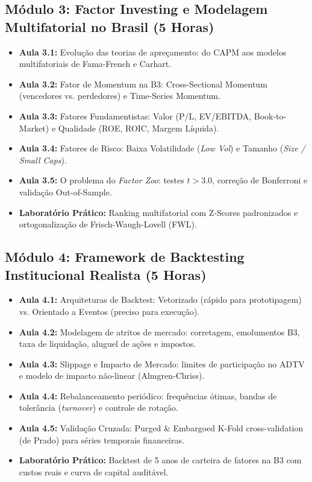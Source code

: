 \documentclass[11pt,a4paper]{article}
\begin{document}
\subsection*{Módulo 3: Factor Investing e Modelagem Multifatorial no Brasil (5 Horas)}
\begin{itemize}[leftmargin=1.5em]
    \item \textbf{Aula 3.1:} Evolução das teorias de apreçamento: do CAPM aos modelos multifatoriais de Fama-French e Carhart.
    \item \textbf{Aula 3.2:} Fator de Momentum na B3: Cross-Sectional Momentum (vencedores vs. perdedores) e Time-Series Momentum.
    \item \textbf{Aula 3.3:} Fatores Fundamentistas: Valor (P/L, EV/EBITDA, Book-to-Market) e Qualidade (ROE, ROIC, Margem Líquida).
    \item \textbf{Aula 3.4:} Fatores de Risco: Baixa Volatilidade (\textit{Low Vol}) e Tamanho (\textit{Size / Small Caps}).
    \item \textbf{Aula 3.5:} O problema do \textit{Factor Zoo}: testes $t > 3.0$, correção de Bonferroni e validação Out-of-Sample.
    \item \textbf{Laboratório Prático:} Ranking multifatorial com Z-Scores padronizados e ortogonalização de Frisch-Waugh-Lovell (FWL).
\end{itemize}

\subsection*{Módulo 4: Framework de Backtesting Institucional Realista (5 Horas)}
\begin{itemize}[leftmargin=1.5em]
    \item \textbf{Aula 4.1:} Arquiteturas de Backtest: Vetorizado (rápido para prototipagem) vs. Orientado a Eventos (preciso para execução).
    \item \textbf{Aula 4.2:} Modelagem de atritos de mercado: corretagem, emolumentos B3, taxa de liquidação, aluguel de ações e impostos.
    \item \textbf{Aula 4.3:} Slippage e Impacto de Mercado: limites de participação no ADTV e modelo de impacto não-linear (Almgren-Chriss).
    \item \textbf{Aula 4.4:} Rebalanceamento periódico: frequências ótimas, bandas de tolerância (\textit{turnover}) e controle de rotação.
    \item \textbf{Aula 4.5:} Validação Cruzada: Purged \& Embargoed K-Fold cross-validation (de Prado) para séries temporais financeiras.
    \item \textbf{Laboratório Prático:} Backtest de 5 anos de carteira de fatores na B3 com custos reais e curva de capital auditável.
\end{itemize}
\end{document}
